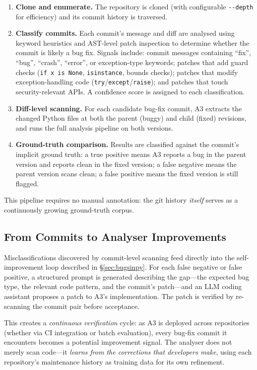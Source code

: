 \documentclass[sigconf,review,anonymous]{acmart}
\begin{document}
\begin{enumerate}
  \item \textbf{Clone and enumerate.} The repository is cloned (with configurable \texttt{-{}-depth} for efficiency) and its commit history is traversed.
  \item \textbf{Classify commits.} Each commit's message and diff are analysed using keyword heuristics and AST-level patch inspection to determine whether the commit is likely a bug fix.  Signals include: commit messages containing ``fix'', ``bug'', ``crash'', ``error'', or exception-type keywords; patches that add guard checks (\texttt{if x is None}, \texttt{isinstance}, bounds checks); patches that modify exception-handling code (\texttt{try}/\texttt{except}/\texttt{raise}); and patches that touch security-relevant APIs.  A confidence score is assigned to each classification.
  \item \textbf{Diff-level scanning.} For each candidate bug-fix commit, \textsc{A3} extracts the changed Python files at both the parent (buggy) and child (fixed) revisions, and runs the full analysis pipeline on both versions.
  \item \textbf{Ground-truth comparison.} Results are classified against the commit's implicit ground truth: a true positive means \textsc{A3} reports a bug in the parent version and reports clean in the fixed version; a false negative means the parent version scans clean; a false positive means the fixed version is still flagged.
\end{enumerate}

This pipeline requires no manual annotation: the git history \emph{itself} serves as a continuously growing ground-truth corpus.

\subsection{From Commits to Analyser Improvements}

Misclassifications discovered by commit-level scanning feed directly into the self-improvement loop described in \S\ref{sec:bugsinpy}.
For each false negative or false positive, a structured prompt is generated describing the gap---the expected bug type, the relevant code pattern, and the commit's patch---and an LLM coding assistant proposes a patch to \textsc{A3}'s implementation.
The patch is verified by re-scanning the commit pair before acceptance.

This creates a \emph{continuous verification} cycle: as \textsc{A3} is deployed across repositories (whether via CI integration or batch evaluation), every bug-fix commit it encounters becomes a potential improvement signal.
The analyser does not merely scan code---it \emph{learns from the corrections that developers make}, using each repository's maintenance history as training data for its own refinement.
\end{document}
